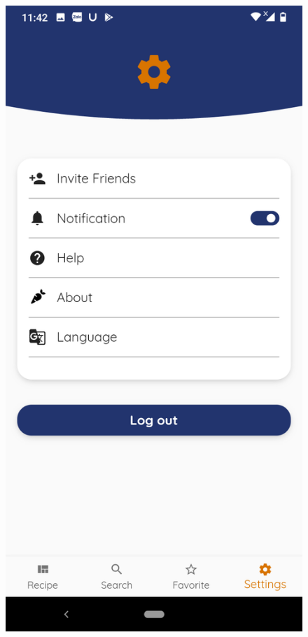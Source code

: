 \documentclass{article}
\begin{document}
\begin{figure}[h!]
    \includegraphics[scale=0.1]{Images/Settings.jpg}

\end{figure}
\end{document}
